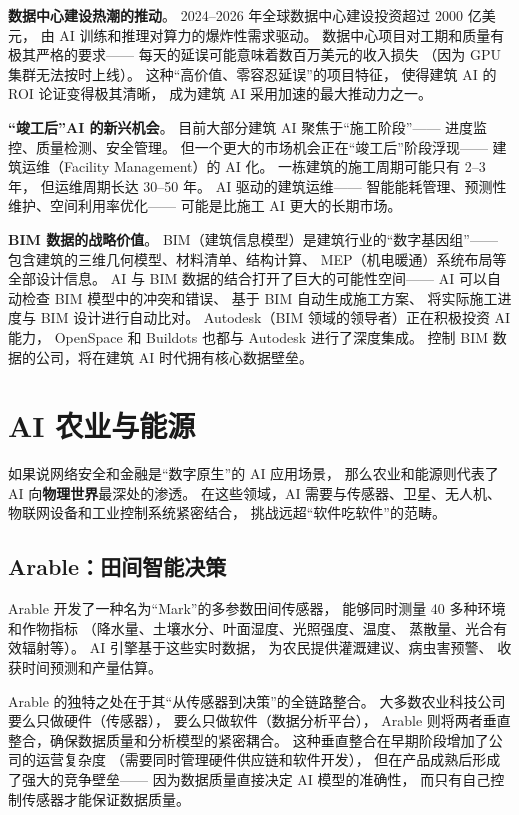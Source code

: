 \textbf{数据中心建设热潮的推动}。
2024--2026 年全球数据中心建设投资超过 2000 亿美元，
由 AI 训练和推理对算力的爆炸性需求驱动。
数据中心项目对工期和质量有极其严格的要求——
每天的延误可能意味着数百万美元的收入损失
（因为 GPU 集群无法按时上线）。
这种``高价值、零容忍延误''的项目特征，
使得建筑 AI 的 ROI 论证变得极其清晰，
成为建筑 AI 采用加速的最大推动力之一。

\textbf{``竣工后''AI 的新兴机会}。
目前大部分建筑 AI 聚焦于``施工阶段''——
进度监控、质量检测、安全管理。
但一个更大的市场机会正在``竣工后''阶段浮现——
建筑运维（Facility Management）的 AI 化。
一栋建筑的施工周期可能只有 2--3 年，
但运维周期长达 30--50 年。
AI 驱动的建筑运维——
智能能耗管理、预测性维护、空间利用率优化——
可能是比施工 AI 更大的长期市场。

\textbf{BIM 数据的战略价值}。
BIM（建筑信息模型）是建筑行业的``数字基因组''——
包含建筑的三维几何模型、材料清单、结构计算、
MEP（机电暖通）系统布局等全部设计信息。
AI 与 BIM 数据的结合打开了巨大的可能性空间——
AI 可以自动检查 BIM 模型中的冲突和错误、
基于 BIM 自动生成施工方案、
将实际施工进度与 BIM 设计进行自动比对。
Autodesk（BIM 领域的领导者）正在积极投资 AI 能力，
OpenSpace 和 Buildots 也都与 Autodesk 进行了深度集成。
控制 BIM 数据的公司，将在建筑 AI 时代拥有核心数据壁垒。


\section{AI 农业与能源}
\label{sec:ent-agriculture}

如果说网络安全和金融是``数字原生''的 AI 应用场景，
那么农业和能源则代表了 AI 向\textbf{物理世界}最深处的渗透。
在这些领域，AI 需要与传感器、卫星、无人机、
物联网设备和工业控制系统紧密结合，
挑战远超``软件吃软件''的范畴。

\subsection{Arable：田间智能决策}

Arable 开发了一种名为``Mark''的多参数田间传感器，
能够同时测量 40 多种环境和作物指标
（降水量、土壤水分、叶面湿度、光照强度、温度、
蒸散量、光合有效辐射等）。
AI 引擎基于这些实时数据，
为农民提供灌溉建议、病虫害预警、
收获时间预测和产量估算。

Arable 的独特之处在于其``从传感器到决策''的全链路整合。
大多数农业科技公司要么只做硬件（传感器），
要么只做软件（数据分析平台），
Arable 则将两者垂直整合，确保数据质量和分析模型的紧密耦合。
这种垂直整合在早期阶段增加了公司的运营复杂度
（需要同时管理硬件供应链和软件开发），
但在产品成熟后形成了强大的竞争壁垒——
因为数据质量直接决定 AI 模型的准确性，
而只有自己控制传感器才能保证数据质量。

